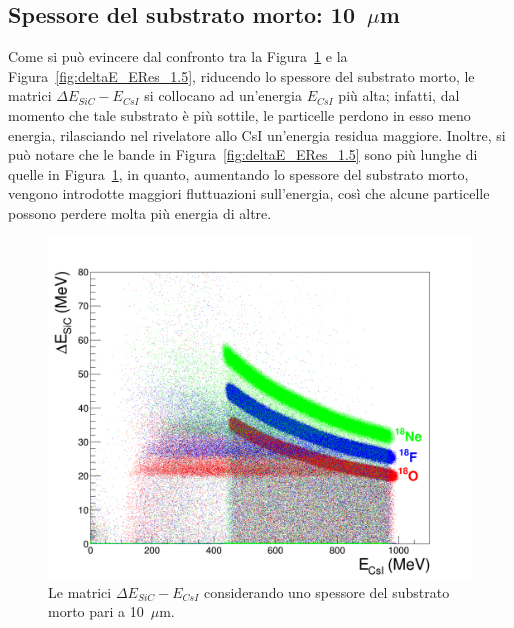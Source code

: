 \subsection*{Spessore del substrato morto: 10~$\mu$m}







Come si può evincere dal confronto tra la Figura~\ref{fig:deltaE_ERes_substrate} e la Figura~\ref{fig:deltaE_ERes_1.5}, riducendo lo spessore del substrato morto, le matrici $\Delta E_{SiC} - E_{CsI}$ si collocano ad un'energia $E_{CsI}$ più alta; infatti, dal momento che tale substrato è più sottile, le particelle perdono in esso meno energia, rilasciando nel rivelatore allo CsI un'energia residua maggiore.
Inoltre, si può notare che le bande in Figura~\ref{fig:deltaE_ERes_1.5} sono più lunghe di quelle in Figura~\ref{fig:deltaE_ERes_substrate}, in quanto, aumentando lo spessore del substrato morto, vengono introdotte maggiori fluttuazioni sull'energia, così che alcune particelle possono perdere molta più energia di altre.




\begin{figure} [!t]
	\centering
	\includegraphics[width=\textwidth, keepaspectratio]{Grafici_Tesi/Substrato/deltaE_ERes.png}
	\caption{Le matrici $\Delta E_{SiC} - E_{CsI}$ considerando uno spessore del substrato morto pari a 10~$\mu$m.} \label{fig:deltaE_ERes_substrate}
\end{figure}



